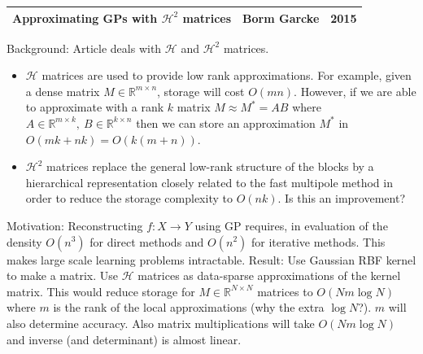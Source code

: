 \documentclass[11pt, oneside]{article}   	%
\begin{document}
\begin{center}\begin{tabular}{| l| l| l|} \hline
Approximating GPs with $\mathcal{H}^2$ matrices & Borm Garcke & 2015 \\ \hline
\end{tabular}\end{center}
Background: Article deals with $\mathcal{H}$ and $\mathcal{H}^2$ matrices. 
\begin{itemize}
\item $\mathcal{H}$ matrices are used to provide low rank approximations. For example, given a dense matrix $M \in \mathbb{R}^{m\times n}$, storage will cost $O(mn)$. However, if we are able to approximate with a rank $k$ matrix $M\approx M^* = AB$ where $A \in \mathbb{R}^{m\times k}, \ B \in \mathbb{R}^{k\times n}$ then we can store an approximation $M^*$ in $O(mk+nk)= O(k(m+n))$.
\item $\mathcal{H}^2$ matrices replace the general low-rank structure of the blocks by a hierarchical representation closely related to the fast multipole method in order to reduce the storage complexity to $O(nk)$. Is this an improvement?
\end{itemize}
Motivation: Reconstructing $f: X\rightarrow Y$ using GP requires, in evaluation of the density $O(n^3)$ for direct methods and $O(n^2)$ for iterative methods. This makes large scale learning problems intractable. 
Result: Use Gaussian RBF kernel to make a matrix. Use $\mathcal{H}$ matrices as data-sparse approximations of the kernel matrix. This would reduce storage for $M \in \mathbb{R}^{N\times N}$ matrices to $O(Nm\log N)$ where $m$ is the rank of the local approximations (why the extra $\log N$?). $m$ will also determine accuracy. Also matrix multiplications will take $O(Nm\log N)$ and inverse (and determinant) is almost linear.
\end{document}
